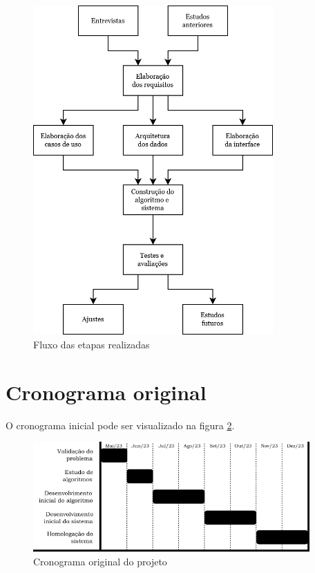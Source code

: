\begin{figure}[ht]
    \begin{center}
    \includegraphics[width=260pt]{figuras/fluxograma-acao}
    \caption{Fluxo das etapas realizadas}
    \label{fig:fluxograma-acao}
    \end{center}
\end{figure}

\section{Cronograma original}

O cronograma inicial pode ser visualizado na figura \ref{fig:cronograma}.

\begin{figure}[ht]
    \begin{center}
    \includegraphics[width=300pt]{figuras/cronograma}
    \caption{Cronograma original do projeto}
    \label{fig:cronograma}
    \end{center}
\end{figure}

